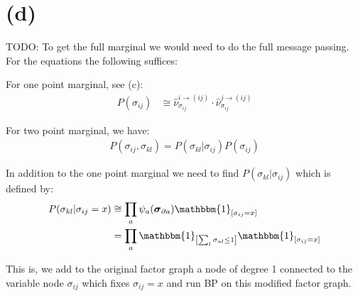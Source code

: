 \documentclass[a4paper]{scrartcl}
\begin{document}
\section*{(d)}
{
\color{green}
TODO: To get the full marginal we would need to do the full message passing. For the equations the following suffices:

}

For one point marginal, see (c):
\begin{align}
    P(\sigma_{ij}) &\cong \hat{\nu}_{\sigma_{ij}}^{i \rightarrow (ij)} \cdot \hat{\nu}_{\sigma_{ij}}^{j \rightarrow (ij)}
\end{align}


For two point marginal, we have:
\begin{align}
    P(\sigma_{ij}, \sigma_{kl}) = P(\sigma_{kl} \vert \sigma_{ij}) P(\sigma_{ij})
\end{align}

In addition to the one point marginal we need to  find $P(\sigma_{kl} \vert \sigma_{ij})$ which is defined by:
\begin{align}
    P(\sigma_{kl} \vert \sigma_{ij} = x) &\cong \prod_{a} \psi_a(\boldsymbol{\sigma}_{\partial a}) \mathbbm{1}_{\left[ \sigma_{ij} = x \right]} \\
    &= \prod_{a} \mathbbm{1}_{\left[ \sum_{l} \sigma_{al} \leq 1 \right]} \mathbbm{1}_{\left[ \sigma_{ij} = x \right]}
\end{align}

This is, we add to the original factor graph a node of degree 1 connected to the variable node $\sigma_{ij}$ which fixes $\sigma_{ij} = x$ and run BP on this modified factor graph.
\end{document}
